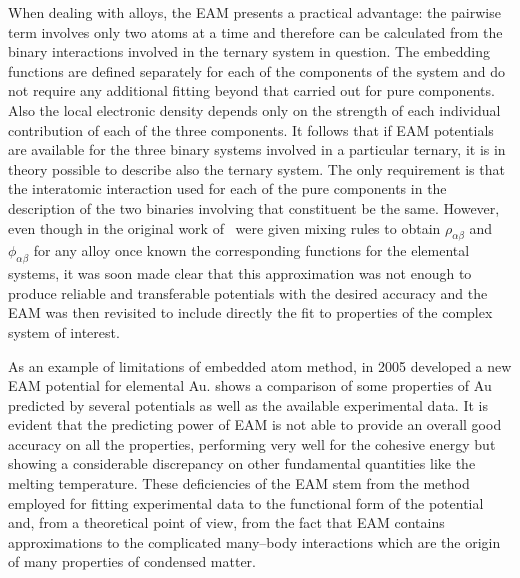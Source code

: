 When dealing with alloys, the EAM presents a practical advantage: the pairwise term involves only two atoms at a time and therefore can be calculated from the binary interactions involved in the ternary system in question. The embedding functions are defined separately for each of the components of the system and do not require any additional fitting beyond that carried out for pure components. Also the local electronic density depends only on the strength of each individual contribution of each of the three components. It follows that if EAM potentials are available for the three binary systems involved in a particular ternary, it is in theory possible to describe also the ternary system. The only requirement is that the interatomic interaction used for each of the pure components in the description of the two binaries involving that constituent be the same. However, even though in the original work of~\textcite{Daw1984EAM} were given mixing rules to obtain $\rho_{\alpha\beta}$ and $\phi_{\alpha\beta}$ for any alloy once known the corresponding functions for the elemental systems, it was soon made clear that this approximation was not enough to produce reliable and transferable potentials with the desired accuracy and the EAM was then revisited to include directly the fit to properties of the complex system of interest.

As an example of limitations of embedded atom method, \textcite{Grochola2005} in 2005 developed a new EAM potential for elemental Au.  shows a comparison of some properties of Au predicted by several potentials as well as the available experimental data. It is evident that the predicting power of EAM is not able to provide an overall good accuracy on all the properties, performing very well for the cohesive energy but showing a considerable discrepancy on other fundamental quantities like the melting temperature. These deficiencies of the EAM stem from the method employed for fitting experimental data to the functional form of the potential and, from a theoretical point of view, from the fact that EAM contains approximations to the complicated many--body interactions which are the origin of many properties of condensed matter.

